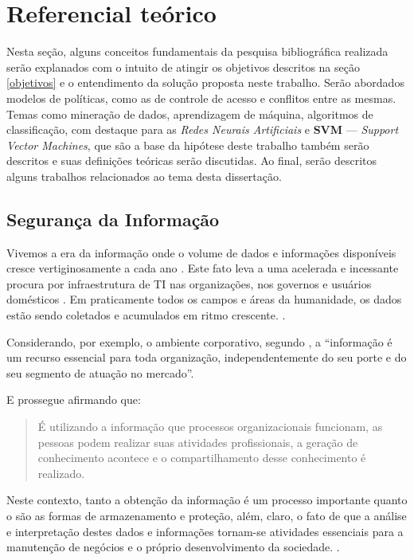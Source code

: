 \chapter{Referencial teórico}\label{referencial_teorico}
Nesta seção, alguns conceitos fundamentais da pesquisa bibliográfica realizada serão explanados com o intuito de atingir os objetivos descritos na seção \ref{objetivos} e o entendimento da solução proposta neste trabalho. Serão abordados modelos de políticas, como as de controle de acesso e conflitos entre as mesmas. Temas como mineração de dados, aprendizagem de máquina, algoritmos de classificação, com destaque para as \textit{Redes Neurais Artificiais} e \textbf{SVM} --- \textit{Support Vector Machines}, que são a base da hipótese deste trabalho também serão descritos e suas definições teóricas serão discutidas. Ao final, serão descritos alguns trabalhos relacionados ao tema desta dissertação.

\section{Segurança da Informação} \label{seguranca_informacao}
Vivemos a era da informação onde o volume de dados e informações disponíveis cresce vertiginosamente a cada ano \cite{alecrim2019}. Este fato leva a uma acelerada e incessante procura por infraestrutura de TI nas organizações, nos governos e usuários domésticos \cite{machado2014}. Em praticamente todos os campos e áreas da humanidade, os dados estão sendo coletados e acumulados em ritmo crescente. \cite{lima_fraud_2012} \cite{fayyad1996}. 

Considerando, por exemplo, o ambiente corporativo, segundo \cite[p.1]{fontes_politicas}, a ``informação é um recurso essencial para toda organização, independentemente do seu porte e do seu segmento de atuação no mercado''. 

E prossegue afirmando que: 
\begin{quotation}
	É utilizando a informação que processos organizacionais funcionam, as pessoas podem realizar suas atividades profissionais, a geração de conhecimento acontece e o compartilhamento desse conhecimento é realizado. \cite[p.1]{fontes_politicas}
\end{quotation}

Neste contexto, tanto a obtenção da informação é um processo importante quanto o são as formas de armazenamento e proteção, além, claro, o fato de que a análise e interpretação destes dados e informações tornam-se atividades essenciais para a manutenção de negócios e o próprio desenvolvimento da sociedade. \cite{Boscarioli2017} \cite{marciano_segurancda_nodate}.

